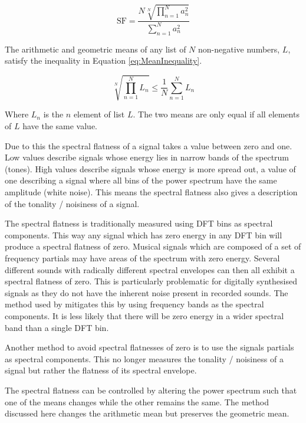 		\begin{equation}
			\textrm{SF} = \frac{N\sqrt[N]{\prod_{n = 1}^{N} a_{n}^{2}}}
				           {\sum_{n = 1}^{N} a_{n}^{2}}
			\label{eq:Flatness}
		\end{equation}

		The arithmetic and geometric means of any list of $N$ non-negative numbers, $L$, satisfy the inequality in
		Equation \ref{eq:MeanInequality}.

		\begin{equation}
			\sqrt[N]{\prod_{n = 1}^{N} L_{n}} \leq \frac{1}{N} \sum_{n = 1}^{N} L_{n}
			\label{eq:MeanInequality}
		\end{equation}

		Where $L_{n}$ is the $n$ element of list $L$. The two means are only equal if all elements of $L$
		have the same value.

		Due to this the spectral flatness of a signal takes a value between zero and one. Low values describe
		signals whose energy lies in narrow bands of the spectrum (tones). High values describe signals whose
		energy is more spread out, a value of one describing a signal where all bins of the power spectrum have the
		same amplitude (white noise). This means the spectral flatness also gives a description of the tonality /
		noisiness of a signal.

		The spectral flatness is traditionally measured using DFT bins as spectral components. This way any signal
		which has zero energy in any DFT bin will produce a spectral flatness of zero. Musical signals which are
		composed of a set of frequency partials may have areas of the spectrum with zero energy. Several different
		sounds with radically different spectral envelopes can then all exhibit a spectral flatness of zero. This
		is particularly problematic for digitally synthesised signals as they do not have the inherent noise
		present in recorded sounds. The method used by \citet{peeters2004a} mitigates this by using frequency bands
		as the spectral components. It is less likely that there will be zero energy in a wider spectral band than
		a single DFT bin. 
		
		Another method to avoid spectral flatnesses of zero is to use the signals partials as spectral components.
		This no longer measures the tonality / noisiness of a signal but rather the flatness of its spectral
		envelope.

		The spectral flatness can be controlled by altering the power spectrum such that one of the means changes
		while the other remains the same. The method discussed here changes the arithmetic mean but preserves the
		geometric mean. 

